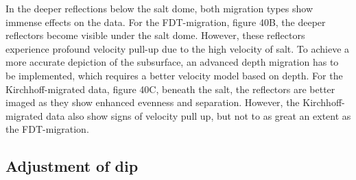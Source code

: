 \documentclass[10pt,a4paper]{article}
\begin{document}
\noindent In the deeper reflections below the salt dome, both migration types show immense effects on the data. For the FDT-migration, figure 40B, the deeper reflectors become visible under the salt dome. However, these reflectors experience profound velocity pull-up due to the high velocity of salt. To achieve a more accurate depiction of the subsurface, an advanced depth migration has to be implemented, which requires a better velocity model based on depth. For the Kirchhoff-migrated data, figure 40C, beneath the salt, the reflectors are better imaged as they show enhanced evenness and separation. However, the Kirchhoff-migrated data also show signs of velocity pull up, but not to as great an extent as the FDT-migration. 

\subsection{Adjustment of dip}
\end{document}
